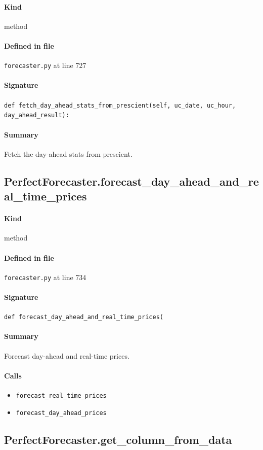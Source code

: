 \documentclass[11pt]{report}
\begin{document}
\paragraph{Kind} method
\paragraph{Defined in file} \texttt{forecaster.py} at line 727
\paragraph{Signature} \texttt{def fetch\_day\_ahead\_stats\_from\_prescient(self, uc\_date, uc\_hour, day\_ahead\_result):}
\paragraph{Summary} Fetch the day-ahead stats from prescient.
\subsection{PerfectForecaster.forecast\_day\_ahead\_and\_real\_time\_prices}
\label{def:forecaster.py:PerfectForecaster.forecast_day_ahead_and_real_time_prices:L734}
\paragraph{Kind} method
\paragraph{Defined in file} \texttt{forecaster.py} at line 734
\paragraph{Signature} \texttt{def forecast\_day\_ahead\_and\_real\_time\_prices(}
\paragraph{Summary} Forecast day-ahead and real-time prices.
\paragraph{Calls}
\begin{itemize}[leftmargin=*]
  \item \texttt{forecast\_real\_time\_prices}
  \item \texttt{forecast\_day\_ahead\_prices}
\end{itemize}
\subsection{PerfectForecaster.get\_column\_from\_data}
\label{def:forecaster.py:PerfectForecaster.get_column_from_data:L762}
\end{document}
